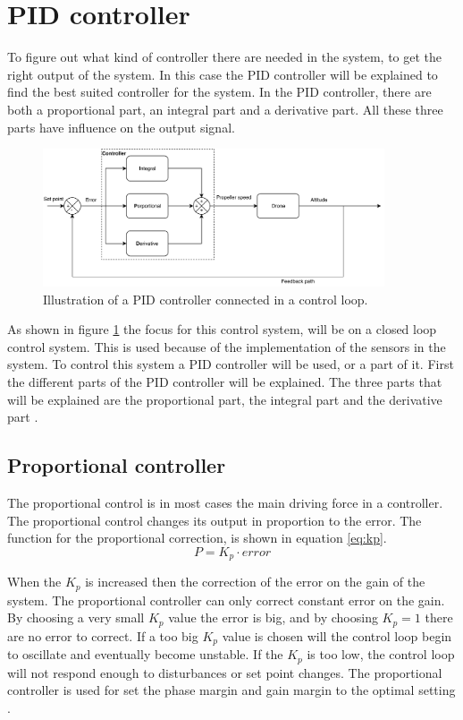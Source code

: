 \section{PID controller}
To figure out what kind of controller there are needed in the system, to get the right output of the system. In this case the PID controller will be explained to find the best suited controller for the system. In the PID controller, there are both a proportional part, an integral part and a derivative part. All these three parts have influence on the output signal. 

\begin{figure}[H]
    \centering
    \includegraphics[width=0.9\textwidth]{figures/ch_design/PIDController/PIDControl.pdf}
    \caption{Illustration of a PID controller connected in a control loop.}
    \label{fig:PID_Controller}
\end{figure}
As shown in figure \ref{fig:PID_Controller} the focus for this control system, will be on a closed loop control system. This is used because of the implementation of the sensors in the system. To control this system a PID controller will be used, or a part of it. First the different parts of the PID controller will be explained. The three parts that will be explained are the proportional part, the integral part and the derivative part \cite{PID_book}.

\subsection*{Proportional controller}
The proportional control is in most cases the main driving force in a controller. The proportional control changes its output in proportion to the error. 
The function for the proportional correction, is shown in equation \ref{eq:kp}.
\begin{equation}\label{eq:kp}
    P=K_p \cdot error
\end{equation}

When the $K_p$ is increased then the correction of the error on the gain of the system. The proportional controller can only correct constant error on the gain. By choosing a very small $K_p$ value the error is big, and by choosing $K_p=1$ there are no error to correct. If a too big $K_p$ value is chosen will the control loop begin to oscillate and eventually become unstable. If the $K_p$ is too low, the control loop will not respond enough to disturbances or set point changes. The proportional controller is used for set the phase margin and gain margin to the optimal setting \cite{PID_book}. 


